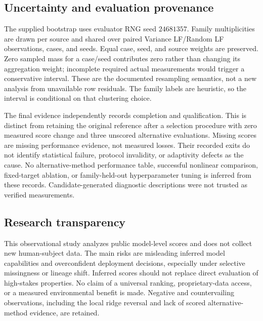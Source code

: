 \documentclass{article}
\begin{document}
\subsection{Uncertainty and evaluation provenance}
The supplied bootstrap uses evaluator RNG seed $24681357$. Family multiplicities are drawn per source and shared over paired Variance LF/Random LF observations, cases, and seeds. Equal case, seed, and source weights are preserved. Zero sampled mass for a case/seed contributes zero rather than changing its aggregation weight; incomplete required actual measurements would trigger a conservative interval. These are the documented resampling semantics, not a new analysis from unavailable row residuals. The family labels are heuristic, so the interval is conditional on that clustering choice.

The final evidence independently records completion and qualification. This is distinct from retaining the original reference after a selection procedure with zero measured score change and three unscored alternative evaluations. Missing scores are missing performance evidence, not measured losses. Their recorded exits do not identify statistical failure, protocol invalidity, or adaptivity defects as the cause. No alternative-method performance table, successful nonlinear comparison, fixed-target ablation, or family-held-out hyperparameter tuning is inferred from these records. Candidate-generated diagnostic descriptions were not trusted as verified measurements.

\subsection{Research transparency}
This observational study analyzes public model-level scores and does not collect new human-subject data. The main risks are misleading inferred model capabilities and overconfident deployment decisions, especially under selective missingness or lineage shift. Inferred scores should not replace direct evaluation of high-stakes properties. No claim of a universal ranking, proprietary-data access, or a measured environmental benefit is made. Negative and countervailing observations, including the local ridge reversal and lack of scored alternative-method evidence, are retained.
\end{document}
